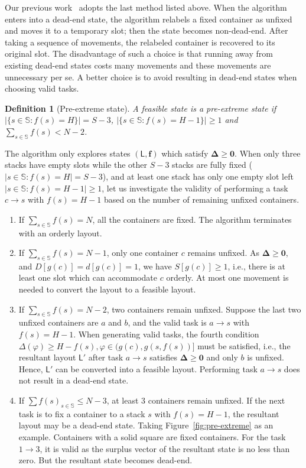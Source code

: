 \documentclass[review,3p,times,12pt,number]{elsarticle}\usepackage{amsmath}\usepackage{amssymb}
\newtheorem{definition}{Definition}
\begin{document}
Our previous work~\citep{wang2015} adopts the last method listed above. When the algorithm enters into a dead-end state, the algorithm relabels a fixed container as unfixed and moves it to a temporary slot; then the state becomes non-dead-end. After taking a sequence of movements, the relabeled container is recovered to its original slot. The disadvantage of such a choice is that running away from existing dead-end states costs many movements and these movements are unnecessary per se. A better choice is to avoid resulting in dead-end states when choosing valid tasks.

\begin{definition}[Pre-extreme state]
A feasible state is a pre-extreme state if $|\{s\in\mathbb{S}: f(s)=H\}|=S-3$, $|\{s\in\mathbb{S}: f(s)=H-1\}|\ge 1$ and $\sum_{s\in\mathbb{S}}f(s)<N-2$.
\end{definition}
The algorithm only explores states $(\mathsf{L},\boldsymbol{f})$ which satisfy $\boldsymbol{\Delta}\ge \boldsymbol{0}$.
When only three stacks have empty slots while the other $S-3$ stacks are fully fixed ($|s \in \mathbb S : f(s)= H| = S- 3$), and at least one stack has only one empty slot left $|s \in \mathbb S : f(s) = H-1| \ge 1$, let us investigate the validity of performing a task $c\rightarrow s$ with $f(s)=H-1$ based on the number of remaining unfixed containers.
\begin{enumerate}
\item If $\sum_{s\in\mathbb{S}} f(s) = N$, all the containers are fixed. The algorithm terminates with an orderly layout.

\item If $\sum_{s\in\mathbb{S}} f(s) = N-1$, only one container $c$ remains unfixed. As $\boldsymbol{\Delta}\ge \boldsymbol {0}$, and $D[g(c)]=d[g(c)]=1$, we have $S[g(c)]\ge1$, i.e., there is at least one slot which can accommodate $c$ orderly. At most one movement is needed to convert the layout to a feasible layout.

\item If $\sum_{s\in\mathbb{S}}f(s) = N-2$, two containers remain unfixed. Suppose the last two unfixed containers are $a$ and $b$, and the valid task is $a\rightarrow s$ with $f(s)=H-1$. When generating valid tasks, the fourth condition $\Delta(\varphi)\ge H-f(s), \varphi \in (g(c),g(s,f(s))]$ must be satisfied, i.e., the resultant layout $\mathsf L'$ after task $a\rightarrow s$ satisfies $\boldsymbol \Delta \ge \boldsymbol{0}$ and only $b$ is unfixed. Hence, $\mathsf L'$ can be converted into a feasible layout. Performing task $a\rightarrow s$ does not result in a dead-end state.

\item If $\sum f(s)_{s\in\mathbb{S}}\le N-3$, at least 3 containers remain unfixed. If the next task is to fix a container to a stack $s$ with $f(s)=H-1$, the resultant layout may be a dead-end state. Taking Figure~\ref{fig:pre-extreme} as an example. Containers with a solid square are fixed containers. For the task $1\rightarrow 3$, it is valid as the surplus vector of the resultant state is no less than zero. But the resultant state becomes dead-end.
\end{enumerate}
\end{document}

